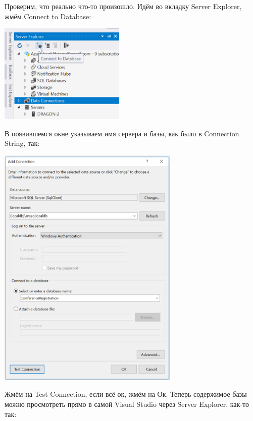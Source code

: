 \documentclass[a5paper]{article}
\begin{document}
Проверим, что реально что-то произошло. Идём во вкладку Server Explorer, жмём Connect to Database:

\begin{center}
	\includegraphics[width=0.45\textwidth]{serverExplorer.png}
\end{center}

В появившемся окне указываем имя сервера и базы, как было в Connection String, так:

\begin{center}
	\includegraphics[width=0.65\textwidth]{addConnection.png}
\end{center}

Жмём на Test Connection, если всё ок, жмём на Ок. Теперь содержимое базы можно просмотреть прямо в самой Visual Studio через Server Explorer, как-то так:
\end{document}
